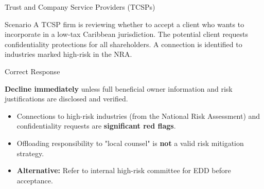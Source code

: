 \documentclass{beamer}
\begin{document}
	\begin{frame}{Trust and Company Service Providers (TCSPs)}
		\begin{block}{Scenario}
			A TCSP firm is reviewing whether to accept a client who wants to incorporate in a low-tax Caribbean jurisdiction. The potential client requests confidentiality protections for all shareholders. A connection is identified to industries marked high-risk in the NRA.
		\end{block}
		\begin{block}{Correct Response}
			\begin{center}
				\textbf{Decline immediately} unless full beneficial owner information and risk justifications are disclosed and verified.
			\end{center}
		\end{block}
		\begin{itemize}
			\item Connections to high-risk industries (from the National Risk Assessment) and confidentiality requests are \textbf{significant red flags}.
			\item Offloading responsibility to "local counsel" is \textbf{not} a valid risk mitigation strategy.
			\item \textbf{Alternative:} Refer to internal high-risk committee for EDD before acceptance.
		\end{itemize}
	\end{frame}
	
\end{document}
